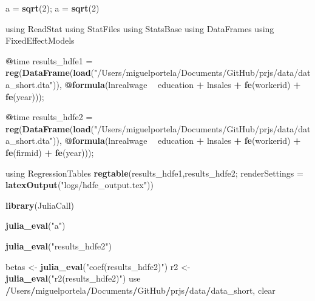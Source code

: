 \documentclass[
  12pt,
]{article}
\newenvironment{Shaded}{\begin{snugshade}}{\end{snugshade}}
\newcommand{\DataTypeTok}[1]{\textcolor[rgb]{0.13,0.29,0.53}{#1}}
\newcommand{\DecValTok}[1]{\textcolor[rgb]{0.00,0.00,0.81}{#1}}
\newcommand{\KeywordTok}[1]{\textcolor[rgb]{0.13,0.29,0.53}{\textbf{#1}}}
\newcommand{\NormalTok}[1]{#1}
\newcommand{\OperatorTok}[1]{\textcolor[rgb]{0.81,0.36,0.00}{\textbf{#1}}}
\newcommand{\StringTok}[1]{\textcolor[rgb]{0.31,0.60,0.02}{#1}}
\begin{document}
\begin{Shaded}
\begin{Highlighting}[]
{\NormalTok{a =}\StringTok{ }\KeywordTok{sqrt}\NormalTok{(}\DecValTok{2}\NormalTok{);}
\NormalTok{a =}\StringTok{ }\KeywordTok{sqrt}\NormalTok{(}\DecValTok{2}\NormalTok{)}

\NormalTok{using ReadStat}
\NormalTok{using StatFiles}
\NormalTok{using StatsBase}
\NormalTok{using DataFrames}
\NormalTok{using FixedEffectModels}

\OperatorTok{@}\NormalTok{time results_hdfe1 =}\StringTok{ }\KeywordTok{reg}\NormalTok{(}\KeywordTok{DataFrame}\NormalTok{(}\KeywordTok{load}\NormalTok{(}\StringTok{"/Users/miguelportela/Documents/GitHub/prjs/data/data_short.dta"}\NormalTok{)), }\OperatorTok{@}\KeywordTok{formula}\NormalTok{(lnrealwage }\OperatorTok{~}\StringTok{ }\NormalTok{education }\OperatorTok{+}\StringTok{ }\NormalTok{lnsales }\OperatorTok{+}\StringTok{ }\KeywordTok{fe}\NormalTok{(workerid) }\OperatorTok{+}\StringTok{ }\KeywordTok{fe}\NormalTok{(year)));}

\OperatorTok{@}\NormalTok{time results_hdfe2 =}\StringTok{ }\KeywordTok{reg}\NormalTok{(}\KeywordTok{DataFrame}\NormalTok{(}\KeywordTok{load}\NormalTok{(}\StringTok{"/Users/miguelportela/Documents/GitHub/prjs/data/data_short.dta"}\NormalTok{)), }\OperatorTok{@}\KeywordTok{formula}\NormalTok{(lnrealwage }\OperatorTok{~}\StringTok{ }\NormalTok{education }\OperatorTok{+}\StringTok{ }\NormalTok{lnsales }\OperatorTok{+}\StringTok{ }\KeywordTok{fe}\NormalTok{(workerid) }\OperatorTok{+}\StringTok{ }\KeywordTok{fe}\NormalTok{(firmid) }\OperatorTok{+}\StringTok{ }\KeywordTok{fe}\NormalTok{(year)));}



\NormalTok{using RegressionTables}
\KeywordTok{regtable}\NormalTok{(results_hdfe1,results_hdfe2; }\DataTypeTok{renderSettings =} \KeywordTok{latexOutput}\NormalTok{(}\StringTok{"logs/hdfe_output.tex"}\NormalTok{))}

\KeywordTok{library}\NormalTok{(JuliaCall)}

\KeywordTok{julia_eval}\NormalTok{(}\StringTok{"a"}\NormalTok{)}

  \KeywordTok{julia_eval}\NormalTok{(}\StringTok{"results_hdfe2"}\NormalTok{)}

\NormalTok{betas <-}\StringTok{ }\KeywordTok{julia_eval}\NormalTok{(}\StringTok{"coef(results_hdfe2)"}\NormalTok{)}
\NormalTok{r2 <-}\StringTok{ }\KeywordTok{julia_eval}\NormalTok{(}\StringTok{"r2(results_hdfe2)"}\NormalTok{)}
\NormalTok{use }\OperatorTok{/}\NormalTok{Users}\OperatorTok{/}\NormalTok{miguelportela}\OperatorTok{/}\NormalTok{Documents}\OperatorTok{/}\NormalTok{GitHub}\OperatorTok{/}\NormalTok{prjs}\OperatorTok{/}\NormalTok{data}\OperatorTok{/}\NormalTok{data_short, clear}

}
\end{Highlighting}
\end{Shaded}
\end{document}
